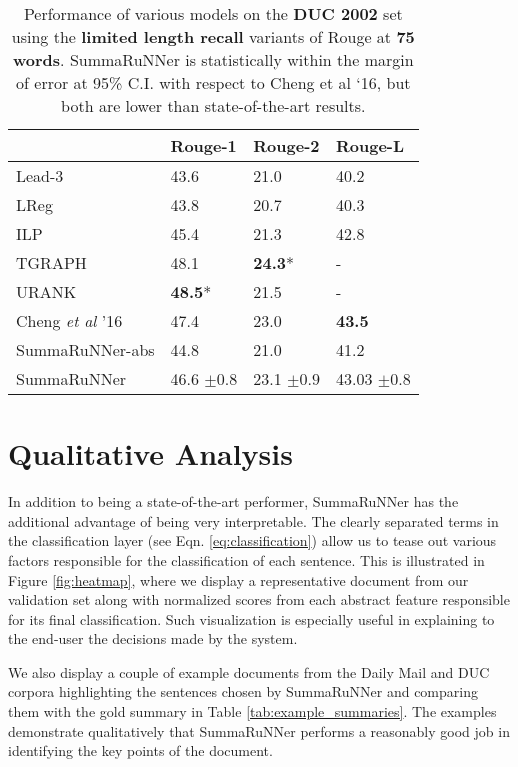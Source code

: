 \documentclass[letterpaper]{article}
\begin{document}
\begin{table}[ht]
\centering
\begin{tabular}{|l|l|l|l|}
\hline
 & Rouge-1 & Rouge-2 & Rouge-L \\
 \hline
Lead-3  & 43.6 & 21.0 & 40.2 \\
LReg & 43.8 & 20.7 & 40.3 \\
ILP & 45.4 & 21.3 & 42.8 \\
TGRAPH & 48.1 & {\bf 24.3}* & - \\
URANK & {\bf 48.5}* & 21.5 & - \\
Cheng {\it et al} '16 & 47.4 & 23.0 & {\bf 43.5} \\
SummaRuNNer-abs & 44.8 & 21.0 & 41.2 \\
SummaRuNNer &  46.6 $\pm 0.8$  & 23.1 $\pm 0.9$ & 43.03 $\pm 0.8$ \\
\hline
\end{tabular}
\caption{{\small Performance of various models on the {\bf DUC 2002} set using the {\bf limited length recall} variants of Rouge at {\bf 75 words}. SummaRuNNer is statistically within the margin of error at 95\% C.I. with respect to Cheng et al `16, but both are lower than state-of-the-art results.}}
\label{tab:perf_duc2002}
\end{table}

\section{Qualitative Analysis}
In addition to being a state-of-the-art performer, SummaRuNNer has the additional advantage of being very interpretable. The clearly separated terms in the classification layer (see Eqn. \ref{eq:classification}) allow us to tease out various factors responsible for the classification of each sentence. This is illustrated in Figure \ref{fig:heatmap}, where we display a representative document from our validation set along with normalized scores from each abstract feature responsible for its final classification. Such visualization is especially useful in explaining to the end-user the decisions made by the system.

We also display a couple of example documents from the Daily Mail and DUC corpora highlighting the sentences chosen by SummaRuNNer and comparing them with the gold summary in Table \ref{tab:example_summaries}. The examples demonstrate qualitatively that SummaRuNNer performs a reasonably good job in identifying the key points of the document.
\end{document}
